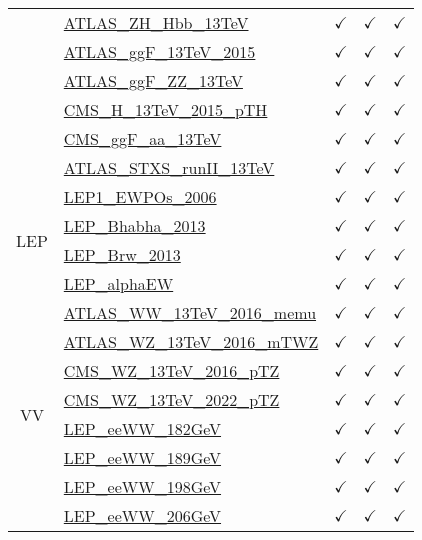\documentclass{article}
\begin{document}
\begin{longtable}{|c|l|c|c|c|}
 & \href{https://arxiv.org}{ATLAS_ZH_Hbb_13TeV}  & $\checkmark$ & $\checkmark$ & $\checkmark$\\ \cline{2-5}
 & \href{https://arxiv.org}{ATLAS_ggF_13TeV_2015}  & $\checkmark$ & $\checkmark$ & $\checkmark$\\ \cline{2-5}
 & \href{https://arxiv.org}{ATLAS_ggF_ZZ_13TeV}  & $\checkmark$ & $\checkmark$ & $\checkmark$\\ \cline{2-5}
 & \href{https://arxiv.org}{CMS_H_13TeV_2015_pTH}  & $\checkmark$ & $\checkmark$ & $\checkmark$\\ \cline{2-5}
 & \href{https://arxiv.org}{CMS_ggF_aa_13TeV}  & $\checkmark$ & $\checkmark$ & $\checkmark$\\ \cline{2-5}
 & \href{https://arxiv.org}{ATLAS_STXS_runII_13TeV}  & $\checkmark$ & $\checkmark$ & $\checkmark$
\\ \hline
\multirow{4}{*}{LEP}
 & \href{https://arxiv.org}{LEP1_EWPOs_2006}  & $\checkmark$ & $\checkmark$ & $\checkmark$\\ \cline{2-5}
 & \href{https://arxiv.org}{LEP_Bhabha_2013}  & $\checkmark$ & $\checkmark$ & $\checkmark$\\ \cline{2-5}
 & \href{https://arxiv.org}{LEP_Brw_2013}  & $\checkmark$ & $\checkmark$ & $\checkmark$\\ \cline{2-5}
 & \href{https://arxiv.org}{LEP_alphaEW}  & $\checkmark$ & $\checkmark$ & $\checkmark$
\\ \hline
\multirow{8}{*}{VV}
 & \href{https://arxiv.org}{ATLAS_WW_13TeV_2016_memu}  & $\checkmark$ & $\checkmark$ & $\checkmark$\\ \cline{2-5}
 & \href{https://arxiv.org}{ATLAS_WZ_13TeV_2016_mTWZ}  & $\checkmark$ & $\checkmark$ & $\checkmark$\\ \cline{2-5}
 & \href{https://arxiv.org}{CMS_WZ_13TeV_2016_pTZ}  & $\checkmark$ & $\checkmark$ & $\checkmark$\\ \cline{2-5}
 & \href{https://arxiv.org}{CMS_WZ_13TeV_2022_pTZ}  & $\checkmark$ & $\checkmark$ & $\checkmark$\\ \cline{2-5}
 & \href{https://arxiv.org}{LEP_eeWW_182GeV}  & $\checkmark$ & $\checkmark$ & $\checkmark$\\ \cline{2-5}
 & \href{https://arxiv.org}{LEP_eeWW_189GeV}  & $\checkmark$ & $\checkmark$ & $\checkmark$\\ \cline{2-5}
 & \href{https://arxiv.org}{LEP_eeWW_198GeV}  & $\checkmark$ & $\checkmark$ & $\checkmark$\\ \cline{2-5}
 & \href{https://arxiv.org}{LEP_eeWW_206GeV}  & $\checkmark$ & $\checkmark$ & $\checkmark$

\end{longtable}
\end{document}
